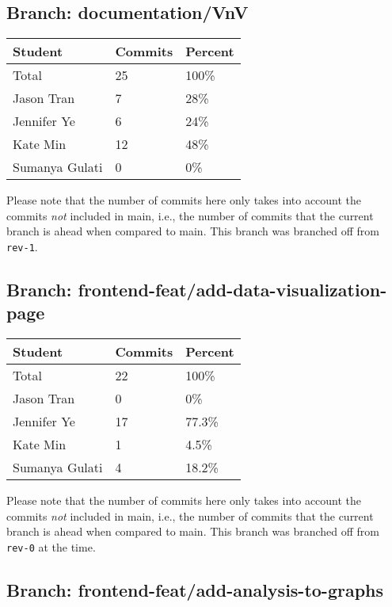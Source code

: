 \documentclass{article}
\begin{document}
\subsection{Branch: documentation/VnV}

\begin{table}[H]
\centering
\begin{tabular}{lll}
\toprule
\textbf{Student} & \textbf{Commits} & \textbf{Percent}\\
\midrule
Total & 25 & 100\% \\
Jason Tran & 7 & 28\% \\
Jennifer Ye & 6 & 24\% \\
Kate Min & 12 & 48\% \\
Sumanya Gulati & 0 & 0\% \\
\bottomrule
\end{tabular}
\end{table}

Please note that the number of commits here only takes into account the commits \emph{not}
included in main, i.e., the number of commits that the current branch is ahead when compared 
to main. This branch was branched off from \texttt{rev-1}.

\subsection{Branch: frontend-feat/add-data-visualization-page}

\begin{table}[H]
\centering
\begin{tabular}{lll}
\toprule
\textbf{Student} & \textbf{Commits} & \textbf{Percent}\\
\midrule
Total & 22 & 100\% \\
Jason Tran & 0 & 0\% \\
Jennifer Ye & 17 & 77.3\% \\
Kate Min & 1 & 4.5\% \\
Sumanya Gulati & 4 & 18.2\% \\
\bottomrule
\end{tabular}
\end{table}

Please note that the number of commits here only takes into account the commits \emph{not}
included in main, i.e., the number of commits that the current branch is ahead when compared 
to main. This branch was branched off from \texttt{rev-0} at the time.

\subsection{Branch: frontend-feat/add-analysis-to-graphs}
\end{document}
